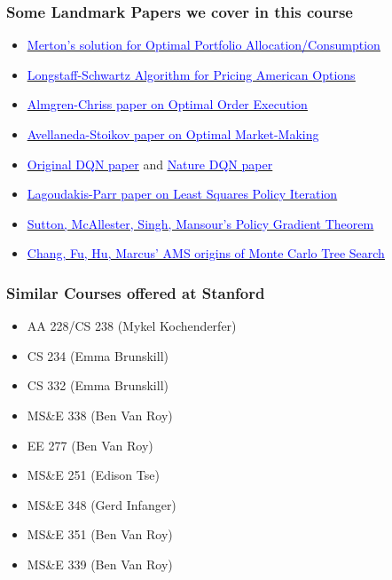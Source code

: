 \documentclass[handout]{beamer}
\begin{document}
\begin{frame}
\frametitle{Some Landmark Papers we cover in this course}
\begin{itemize}
\item \href{https://www.jstor.org/stable/1926560}{\underline{\textcolor{blue}{Merton's solution for Optimal Portfolio Allocation/Consumption}}}
\item \href{https://people.math.ethz.ch/~hjfurrer/teaching/LongstaffSchwartzAmericanOptionsLeastSquareMonteCarlo.pdf}{\underline{\textcolor{blue}{Longstaff-Schwartz Algorithm for Pricing American Options}}}
\item \href{https://pdfs.semanticscholar.org/3d2d/773983c5201b58586af463f045befae5bbf2.pdf}{\underline{\textcolor{blue}{Almgren-Chriss paper on Optimal Order Execution}}}
\item \href{https://www.math.nyu.edu/faculty/avellane/HighFrequencyTrading.pdf}{\underline{\textcolor{blue}{Avellaneda-Stoikov paper on Optimal Market-Making}}}
\item \href{https://www.cs.toronto.edu/~vmnih/docs/dqn.pdf}{\underline{\textcolor{blue}{Original DQN paper}}} and \href{https://storage.googleapis.com/deepmind-media/dqn/DQNNaturePaper.pdf}{\underline{\textcolor{blue}{Nature DQN paper}}}
\item \href{http://www.jmlr.org/papers/volume4/lagoudakis03a/lagoudakis03a.pdf}{\underline{\textcolor{blue}{Lagoudakis-Parr paper on Least Squares Policy Iteration}}}
\item \href{http://papers.nips.cc/paper/1713-policy-gradient-methods-for-reinforcement-learning-with-function-approximation.pdf}{\underline{\textcolor{blue}{Sutton, McAllester, Singh, Mansour's Policy Gradient Theorem}}}
\item \href{https://pdfs.semanticscholar.org/a378/b2895a3e3f6a19cdff1a0ad404b301b5545f.pdf}{\underline{\textcolor{blue}{Chang, Fu, Hu, Marcus' AMS origins of Monte Carlo Tree Search}}}
\end{itemize}
\end{frame}


\begin{frame}
\frametitle{Similar Courses offered at Stanford}
\begin{itemize}
\item AA 228/CS 238 (Mykel Kochenderfer)
\item CS 234 (Emma Brunskill)
\item CS 332 (Emma Brunskill)
\item MS\&E 338 (Ben Van Roy)
\item EE 277 (Ben Van Roy)
\item MS\&E 251 (Edison Tse)
\item MS\&E 348 (Gerd Infanger)
\item MS\&E 351 (Ben Van Roy)
\item MS\&E 339 (Ben Van Roy)
\end{itemize}
\end{frame}
\end{document}
